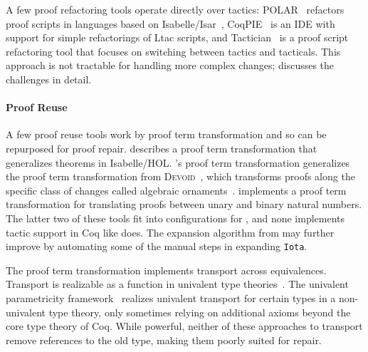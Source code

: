 A few proof refactoring tools operate directly over tactics:
POLAR~\cite{Dietrich2013} refactors proof scripts in languages based on Isabelle/Isar~\cite{Wenzel2007isar},
CoqPIE~\cite{Roe2016} is an IDE with support for simple refactorings of Ltac scripts, and
Tactician~\cite{adams2015} is a proof script refactoring tool that focuses on switching between tactics and tacticals.
This approach is not tractable for handling more complex changes;
\citet{robert2018} discusses the challenges in detail.

\paragraph{Proof Reuse}

A few proof reuse tools work by proof term transformation and so can be repurposed for proof repair.
\citet{Johnsen2004} describes a proof term transformation that generalizes theorems in Isabelle/HOL.
\toolname's proof term transformation generalizes the proof term transformation from \textsc{Devoid}~\cite{Ringer2019},
which transforms proofs along the specific class of changes called algebraic ornaments~\cite{mcbride}.
\citet{magaud2000changing} implements a proof term transformation for translating proofs between
unary and binary natural numbers. 
The latter two of these tools fit into configurations for \toolname,
and none implements tactic support in Coq like \toolname does.
The expansion algorithm from \citet{magaud2000changing} may further improve \toolname
by automating some of the manual steps in expanding \lstinline{Iota}.

The \toolname proof term transformation implements transport across equivalences.
Transport is realizable as a function in univalent type theories~\cite{univalent2013homotopy}.
The univalent parametricity framework~\cite{tabareau2017equivalences} realizes univalent transport for certain types
in a non-univalent type theory, only sometimes relying on additional axioms beyond the core type theory of Coq.
While powerful, neither of these approaches to transport remove references to the old type, making them poorly suited for repair.

